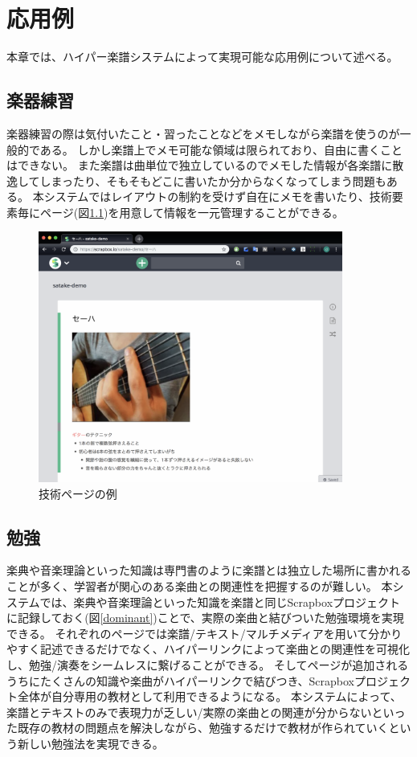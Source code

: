 \chapter{応用例}
\label{chap:ouyou}

本章では、ハイパー楽譜システムによって実現可能な応用例について述べる。

\newpage

\section{楽器練習}
楽器練習の際は気付いたこと・習ったことなどをメモしながら楽譜を使うのが一般的である。
しかし楽譜上でメモ可能な領域は限られており、自由に書くことはできない。
また楽譜は曲単位で独立しているのでメモした情報が各楽譜に散逸してしまったり、そもそもどこに書いたか分からなくなってしまう問題もある。
本システムではレイアウトの制約を受けず自在にメモを書いたり、技術要素毎にページ(図\ref{seja})を用意して情報を一元管理することができる。

\begin{figure}[H]
\centering
\includegraphics[width=10cm]{images/seja.png}
\caption{技術ページの例}
\label{seja}
\end{figure}

\section{勉強}
楽典や音楽理論といった知識は専門書のように楽譜とは独立した場所に書かれることが多く、学習者が関心のある楽曲との関連性を把握するのが難しい。
本システムでは、楽典や音楽理論といった知識を楽譜と同じScrapboxプロジェクトに記録しておく(図\ref{dominant})ことで、実際の楽曲と結びついた勉強環境を実現できる。
それぞれのページでは楽譜/テキスト/マルチメディアを用いて分かりやすく記述できるだけでなく、ハイパーリンクによって楽曲との関連性を可視化し、勉強/演奏をシームレスに繋げることができる。
そしてページが追加されるうちにたくさんの知識や楽曲がハイパーリンクで結びつき、Scrapboxプロジェクト全体が自分専用の教材として利用できるようになる。
本システムによって、楽譜とテキストのみで表現力が乏しい/実際の楽曲との関連が分からないといった既存の教材の問題点を解決しながら、勉強するだけで教材が作られていくという新しい勉強法を実現できる。

